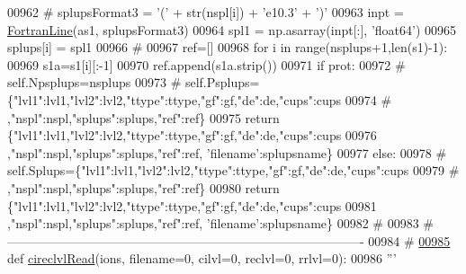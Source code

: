 \begin{DoxyCode}
{{{{{{{{{{{{00962 \textcolor{comment}{#            splupsFormat3 = '(' + str(nspl[i]) + 'e10.3' + ')'}
00963             inpt = \hyperlink{classpyneb_1_1utils_1_1_fortran_format_1_1_fortran_line}{FortranLine}(as1, splupsFormat3)
00964             spl1 = np.asarray(inpt[:], \textcolor{stringliteral}{'float64'})
00965             splups[i] = spl1
00966         \textcolor{comment}{#}
00967         ref=[]
00968         \textcolor{keywordflow}{for} i \textcolor{keywordflow}{in} range(nsplups+1,len(s1)-1):
00969             s1a=s1[i][:-1]
00970             ref.append(s1a.strip())
00971         \textcolor{keywordflow}{if} prot:
00972 \textcolor{comment}{#            self.Npsplups=nsplups}
00973 \textcolor{comment}{#            self.Psplups=\{"lvl1":lvl1,"lvl2":lvl2,"ttype":ttype,"gf":gf,"de":de,"cups":cups}
00974 \textcolor{comment}{#                ,"nspl":nspl,"splups":splups,"ref":ref\}}
00975             \textcolor{keywordflow}{return} \{\textcolor{stringliteral}{"lvl1"}:lvl1,\textcolor{stringliteral}{"lvl2"}:lvl2,\textcolor{stringliteral}{"ttype"}:ttype,\textcolor{stringliteral}{"gf"}:gf,\textcolor{stringliteral}{"de"}:de,\textcolor{stringliteral}{"cups"}:cups
00976                 ,\textcolor{stringliteral}{"nspl"}:nspl,\textcolor{stringliteral}{"splups"}:splups,\textcolor{stringliteral}{"ref"}:ref, \textcolor{stringliteral}{'filename'}:splupsname\}
00977         \textcolor{keywordflow}{else}:
00978 \textcolor{comment}{#            self.Splups=\{"lvl1":lvl1,"lvl2":lvl2,"ttype":ttype,"gf":gf,"de":de,"cups":cups}
00979 \textcolor{comment}{#                ,"nspl":nspl,"splups":splups,"ref":ref\}}
00980             \textcolor{keywordflow}{return} \{\textcolor{stringliteral}{"lvl1"}:lvl1,\textcolor{stringliteral}{"lvl2"}:lvl2,\textcolor{stringliteral}{"ttype"}:ttype,\textcolor{stringliteral}{"gf"}:gf,\textcolor{stringliteral}{"de"}:de,\textcolor{stringliteral}{"cups"}:cups
00981                 ,\textcolor{stringliteral}{"nspl"}:nspl,\textcolor{stringliteral}{"splups"}:splups,\textcolor{stringliteral}{"ref"}:ref, \textcolor{stringliteral}{'filename'}:splupsname\}
00982     \textcolor{comment}{#}
00983     \textcolor{comment}{# -------------------------------------------------------------------------------------}
00984     \textcolor{comment}{#}
\hypertarget{__chianti__tools_8py_source_l00985}{}\hyperlink{namespacepyneb_1_1utils_1_1__chianti__tools_a0811a3ad9efb623a53fd1ebfd8c5c73f}{00985} \textcolor{keyword}{def }\hyperlink{namespacepyneb_1_1utils_1_1__chianti__tools_a0811a3ad9efb623a53fd1ebfd8c5c73f}{cireclvlRead}(ions, filename=0, cilvl=0, reclvl=0, rrlvl=0):
00986     \textcolor{stringliteral}{'''}
}}}}}}}}}}}}
\end{DoxyCode}

